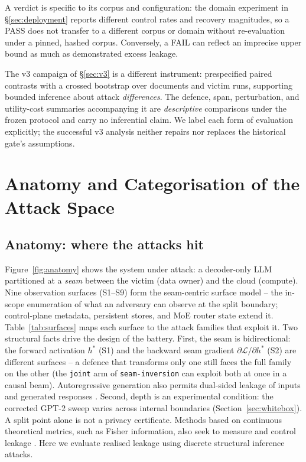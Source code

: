 \documentclass[11pt]{article}
\newcommand{\attack}[1]{\nolinkurl{#1}}
\begin{document}
A verdict is specific to its corpus and configuration: the domain experiment in \S\ref{sec:deployment} reports different control rates and recovery magnitudes, so a PASS does not transfer to a different corpus or domain
without re-evaluation under a pinned, hashed corpus. Conversely, a FAIL can reflect an imprecise upper
bound as much as demonstrated excess leakage.

The v3 campaign of
\S\ref{sec:v3} is a different instrument: prespecified paired
contrasts with a crossed bootstrap over documents and victim runs,
supporting bounded inference about attack \emph{differences}. The defence,
span, perturbation, and utility-cost summaries accompanying it are
\emph{descriptive} comparisons under the frozen protocol and carry no
inferential claim. We label each form of evaluation explicitly; the successful
v3 analysis neither repairs nor replaces the historical gate's
assumptions.

\section{Anatomy and Categorisation of the Attack Space}
\label{sec:taxonomy}

\subsection{Anatomy: where the attacks hit}

Figure~\ref{fig:anatomy} shows the system under attack: a decoder-only LLM
partitioned at a \emph{seam} between the victim (data owner) and the cloud
(compute). Nine observation surfaces (S1--S9) form the seam-centric surface model -- the in-scope enumeration of what an adversary can observe at the split
boundary; control-plane metadata, persistent stores, and MoE router state
extend it. Table~\ref{tab:surfaces} maps each surface to the attack families
that exploit it. Two structural facts drive the design of the battery.
First, the seam is bidirectional: the forward activation $h^{*}$ (S1) and
the backward seam gradient $\partial\mathcal{L}/\partial h^{*}$ (S2) are
different surfaces -- a defence that transforms only one still faces the
full family on the other (the \texttt{joint} arm of
\attack{seam-inversion} can exploit both at once in a causal beam). Autoregressive generation also permits dual-sided leakage of inputs and generated responses \cite{gu2026pidi}. Second, depth is an experimental condition: the corrected GPT-2 sweep
varies across internal boundaries (Section~\ref{sec:whitebox}). A split
point alone is not a privacy certificate. Methods based on continuous theoretical metrics, such as Fisher information, also seek to measure and control leakage \cite{maeng2022refil}. Here we evaluate realised leakage using discrete structural inference attacks.
\end{document}
